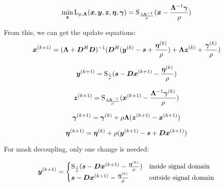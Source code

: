 \documentclass{article}
\begin{document}
\begin{equation}
\min_{\bm{z}} \operatorname{L}_{\rho,\bm{\Lambda}}(\bm{x},\bm{y},\bm{z},\bm{\eta},\bm{\gamma}) = \operatorname{S}_{\frac{\lambda\bm{\Lambda}^{-1}}{\rho}}(\bm{x} - \frac{\bm{\Lambda}^{-1}\bm{\gamma}}{\rho})
\end{equation}

From this, we can get the update equations:
\begin{equation}
\bm{x}^{(k + 1)} = (\bm{\Lambda} + \bm{D}^H\bm{D})^{-1}(\bm{D}^H(\bm{y}^{(k)} - \bm{s} + \frac{\bm{\eta}^{(k)}}{\rho}) + \bm{\Lambda}\bm{z}^{(k)} + \frac{\bm{\gamma}^{(k)}}{\rho})
\end{equation}

\begin{equation}
\bm{y}^{(k + 1)}= \operatorname{S}_{\frac{1}{\rho}}(\bm{s} - \bm{D}\bm{x}^{(k + 1)} - \frac{\bm{\eta}^{(k)}}{\rho})
\end{equation}

\begin{equation}
\bm{z}^{(k + 1)}= \operatorname{S}_{\frac{\lambda\bm{\Lambda}^{-1}}{\rho}}(\bm{x}^{(k + 1)} - \frac{\bm{\Lambda}^{-1}\bm{\gamma}^{(k)}}{\rho})
\end{equation}

\begin{equation}
\bm{\gamma}^{(k + 1)} = \bm{\gamma}^{(k)} + \rho\bm{\Lambda}(\bm{z}^{(k + 1)} - \bm{x}^{(k + 1)})
\end{equation}

\begin{equation}
\bm{\eta}^{(k + 1)} = \bm{\eta}^{(k)} + \rho(\bm{y}^{(k + 1)} - \bm{s} + \bm{D}\bm{x}^{(k + 1)})
\end{equation}

For mask decoupling, only one change is needed:

\begin{equation}
\bm{y}^{(k + 1)}= \begin{cases}
\operatorname{S}_{\frac{1}{\rho}}(\bm{s} - \bm{D}\bm{x}^{(k + 1)} - \frac{\bm{\eta}^{(k)}}{\rho}) & \text{inside signal domain} \\
\bm{s} - \bm{D}\bm{x}^{(k + 1)} - \frac{\bm{\eta}^{(k)}}{\rho} & \text{outside signal domain}
\end{cases}
\end{equation}
\end{document}
